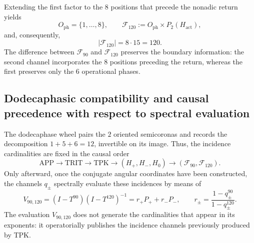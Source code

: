Extending the first factor to the \(8\) positions that precede the nonadic
return yields
\[
 O_{\mathrm{ph}}=\{1,\ldots,8\},
 \qquad
 \mathcal F_{120}
 :=O_{\mathrm{ph}}\times P_2(H_{\mathrm{act}}),
\]
and, consequently,
\[
 |\mathcal F_{120}|=8\cdot15=120.
\]
The difference between \(\mathcal F_{90}\) and \(\mathcal F_{120}\) preserves the
boundary information: the second channel incorporates the \(8\) positions
preceding the return, whereas the first preserves only the
\(6\) operational phases.

\subsection{Dodecaphasic compatibility and causal precedence with respect to spectral evaluation}

The dodecaphase wheel pairs the \(2\) oriented semicoronas and records the
decomposition \(1+5+6=12\), invertible on its image. Thus, the incidence
cardinalities are fixed in the causal order
\[
 \mathrm{APP}\longrightarrow\mathrm{TRIT}\longrightarrow\mathrm{TPK}
 \longrightarrow(H_+,H_-,H_0)
 \longrightarrow(\mathcal F_{90},\mathcal F_{120}).
\]
Only afterward, once the conjugate angular coordinates have been constructed, the
channels \(q_\pm\) spectrally evaluate these incidences by means of
\[
 V_{90,120}
 =(I-T^{90})(I-T^{120})^{-1}
 =r_+P_++r_-P_-,
 \qquad
 r_\pm=\frac{1-q_\pm^{90}}{1-q_\pm^{120}}.
\]
The evaluation \(V_{90,120}\) does not generate the cardinalities that appear in its
exponents: it operatorially publishes the incidence channels previously produced by
TPK.
